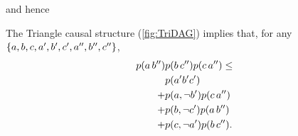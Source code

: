 and hence
\begin{prop} \label{prop:TriNoGoFritz}
The Triangle causal structure (\cref{fig:TriDAG}) implies that, for any $\left\lbrace a,b,c,a',b',c',a'',b'',c''\right\rbrace$,
\begin{align}\begin{split}\label{eq:fourtermineq}
\p{a\, b''}&\p{b\, c''}\p{c\, a''}\leq
\\ &\p{a' b' c'}
\\+&\p{a,\nb'}\p{c\, a''}
\\+&\p{b,\nc'}\p{a\, b''}
\\+&\p{c,\na'}\p{b\, c''}.
\end{split}\end{align}
\end{prop}


